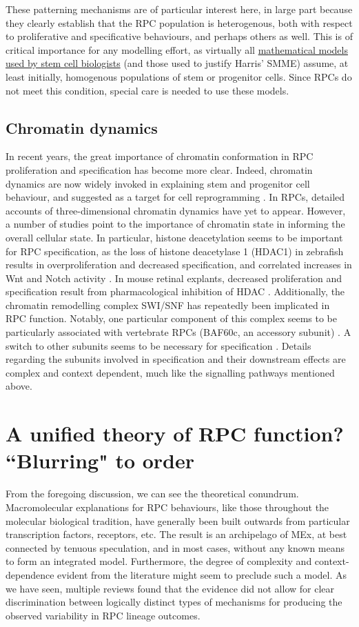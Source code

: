 These patterning mechanisms are of particular interest here, in large part because they clearly establish that the RPC population is heterogenous, both with respect to proliferative and specificative behaviours, and perhaps others as well. This is of critical importance for any modelling effort, as virtually all \hyperref[SSM]{mathematical models used by stem cell biologists} (and those used to justify Harris' SMME) assume, at least initially, homogenous populations of stem or progenitor cells. Since RPCs do not meet this condition, special care is needed to use these models.

\subsection{Chromatin dynamics}

In recent years, the great importance of chromatin conformation in RPC proliferation and specification has become more clear. Indeed, chromatin dynamics are now widely invoked in explaining stem and progenitor cell behaviour, and suggested as a target for cell reprogramming \cite{Kondo2006,Tee2014}. In RPCs, detailed accounts of three-dimensional chromatin dynamics have yet to appear. However, a number of studies point to the importance of chromatin state in informing the overall cellular state. In particular, histone deacetylation seems to be important for RPC specification, as the loss of histone deacetylase 1 (HDAC1) in zebrafish results in overproliferation and decreased specification, and correlated increases in Wnt and Notch activity \cite{Yamaguchi2005}. In mouse retinal explants, decreased proliferation and specification result from  pharmacological inhibition of HDAC \cite{Chen2007}. Additionally, the chromatin remodelling complex SWI/SNF has repeatedly been implicated in RPC function. Notably, one particular component of this complex seems to be particularly associated with vertebrate RPCs (BAF60c, an accessory subunit) \cite{Lamba2008}. A switch to other subunits seems to be necessary for specification \cite{Lessard2007}. Details regarding the subunits involved in specification and their downstream effects are complex and context dependent, much like the signalling pathways mentioned above.

\section{A unified theory of RPC function? ``Blurring" to order}

From the foregoing discussion, we can see the theoretical conundrum. Macromolecular explanations for RPC behaviours, like those throughout the molecular biological tradition, have generally been built outwards from particular transcription factors, receptors, etc. The result is an archipelago of MEx, at best connected by tenuous speculation, and in most cases, without any known means to form an integrated model. Furthermore, the degree of complexity and context-dependence evident from the literature might seem to preclude such a model. As we have seen, multiple reviews found that the evidence did not allow for clear discrimination between logically distinct types of mechanisms for producing the observed variability in RPC lineage outcomes.

